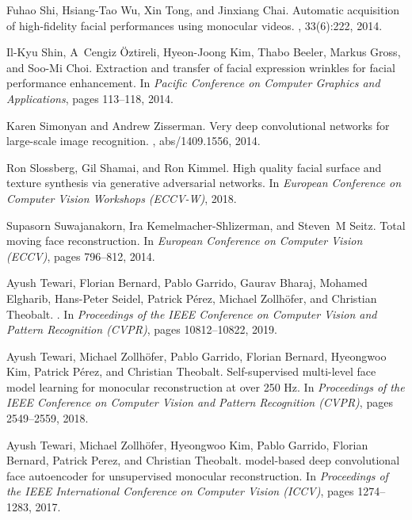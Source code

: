 \documentclass[final]{cvpr}
\begin{document}
{\begin{thebibliography}{10}
Fuhao Shi, Hsiang-Tao Wu, Xin Tong, and Jinxiang Chai.
\newblock Automatic acquisition of high-fidelity facial performances using
  monocular videos.
, 33(6):222, 2014.

Il-Kyu Shin, A~Cengiz {\"O}ztireli, Hyeon-Joong Kim, Thabo Beeler, Markus
  Gross, and Soo-Mi Choi.
\newblock Extraction and transfer of facial expression wrinkles for facial
  performance enhancement.
\newblock In {\em Pacific Conference on Computer Graphics and Applications},
  pages 113--118, 2014.

Karen Simonyan and Andrew Zisserman.
\newblock Very deep convolutional networks for large-scale image recognition.
, abs/1409.1556, 2014.

Ron Slossberg, Gil Shamai, and Ron Kimmel.
\newblock High quality facial surface and texture synthesis via generative
  adversarial networks.
\newblock In {\em European Conference on Computer Vision Workshops (ECCV-W)},
  2018.

Supasorn Suwajanakorn, Ira Kemelmacher-Shlizerman, and Steven~M Seitz.
\newblock Total moving face reconstruction.
\newblock In {\em European Conference on Computer Vision (ECCV)}, pages
  796--812, 2014.

Ayush Tewari, Florian Bernard, Pablo Garrido, Gaurav Bharaj, Mohamed Elgharib,
  Hans-Peter Seidel, Patrick P{\'e}rez, Michael Zollh{\"o}fer, and Christian
  Theobalt.
.
\newblock In {\em Proceedings of the IEEE Conference on Computer Vision and
  Pattern Recognition (CVPR)}, pages 10812--10822, 2019.

Ayush Tewari, Michael Zollh{\"o}fer, Pablo Garrido, Florian Bernard, Hyeongwoo
  Kim, Patrick P{\'e}rez, and Christian Theobalt.
\newblock Self-supervised multi-level face model learning for monocular
  reconstruction at over 250 {Hz}.
\newblock In {\em Proceedings of the IEEE Conference on Computer Vision and
  Pattern Recognition (CVPR)}, pages 2549--2559, 2018.

Ayush Tewari, Michael Zollh{\"o}fer, Hyeongwoo Kim, Pablo Garrido, Florian
  Bernard, Patrick Perez, and Christian Theobalt.
 model-based deep convolutional face autoencoder for
  unsupervised monocular reconstruction.
\newblock In {\em Proceedings of the IEEE International Conference on Computer
  Vision (ICCV)}, pages 1274--1283, 2017.


\end{thebibliography}}
\end{document}
